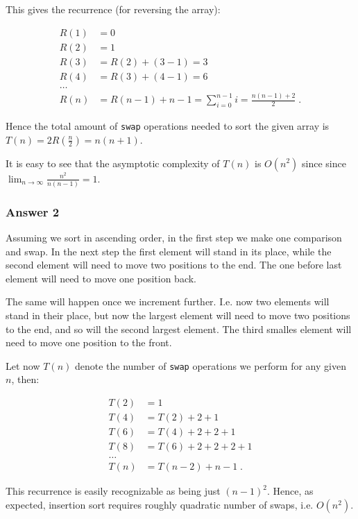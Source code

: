 \documentclass[11pt]{article}
\begin{document}
This gives the recurrence (for reversing the array):

\begin{align*}
  R(1) &= 0 \\
  R(2) &= 1 \\
  R(3) &= R(2) + (3 - 1) = 3 \\
  R(4) &= R(3) + (4 - 1) = 6 \\
  \dots \\
  R(n) &= R(n-1) + n - 1 = \sum_{i=0}^{n-1}i = \frac{n(n-1)+2}{2}\;.
\end{align*}

Hence the total amount of \texttt{swap} operations needed to sort the given array
is \(T(n) = 2R(\frac{n}{2}) = n(n+1)\).

It is easy to see that the asymptotic complexity of \(T(n)\) is \(O(n^2)\) since
since \(\lim_{n \to \infty}\frac{n^2}{n(n-1)}=1\).

\subsubsection{Answer 2}
\label{sec:orgheadline2}
Assuming we sort in ascending order, in the first step we make one
comparison and swap.  In the next step the first element will stand in its
place, while the second element will need to move two positions to the end.
The one before last element will need to move one position back.

The same will happen once we increment further.  I.e. now two elements will
stand in their place, but now the largest element will need to move two
positions to the end, and so will the second largest element.  The third
smalles element will need to move one position to the front.

Let now \(T(n)\) denote the number of \texttt{swap} operations we perform for any
given \(n\), then:

\begin{align*}
  T(2) &= 1 \\
  T(4) &= T(2) + 2 + 1 \\
  T(6) &= T(4) + 2 + 2 + 1 \\
  T(8) &= T(6) + 2 + 2 + 2 + 1 \\
  \dots \\
  T(n) &= T(n-2) + n - 1\;.
\end{align*}

This recurrence is easily recognizable as being just \((n-1)^2\).  Hence, as
expected, insertion sort requires roughly quadratic number of swaps,
i.e. \(O(n^2)\).
\end{document}
